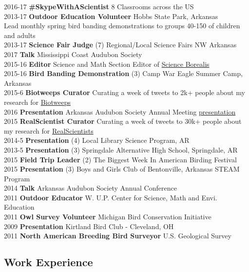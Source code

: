 \documentclass[]{article}
\begin{document}
2016-17 \textbf{\#SkypeWithAScientist} 8 Classrooms across the US\\
2013-17 \textbf{Outdoor Education Volunteer} Hobbs State Park,
Arkansas\\
Lead monthly spring bird banding demonstrations to groups 40-150 of
children and adults\\
2013-17 \textbf{Science Fair Judge} (7) Regional/Local Science Fairs NW
Arkansas\\
2017 \textbf{Talk} Mississippi Coast Audubon Society\\
2015-16 \textbf{Editor} Science and Math Section Editor of
\href{http://scienceborealis.ca/}{Science Borealis}\\
2015-16 \textbf{Bird Banding Demonstration} (3) Camp War Eagle Summer
Camp, Arkansas\\
2015-6 \textbf{Biotweeps Curator} Curating a week of tweets to 2k+
people about my research for
\href{https://biotweep.wordpress.com/about/}{Biotweeps}\\
2016 \textbf{Presentation} Arkansas Audubon Society Annual Meeting
\href{https://dx.doi.org/10.6084/m9.figshare.3206122.v1}{presentation}\\
2015 \textbf{RealScientist Curator} Curating a week of tweets to 30k+
people about my research for
\href{http://realscientists.org/}{RealScientists}\\
2014-5 \textbf{Presentation} (4) Local Library Science Program, AR\\
2013-5 \textbf{Presentation} (3) Springdale Alternative High School,
Springdale, AR\\
2015 \textbf{Field Trip Leader} (2) The Biggest Week In American Birding
Festival\\
2015 \textbf{Presentation} (3) Boys and Girls Club of Bentonville,
Arkansas STEAM Program\\
2014 \textbf{Talk} Arkansas Audubon Society Annual Conference\\
2011 \textbf{Outdoor Educator} W. U.P. Center for Science, Math and
Envi. Education\\
2011 \textbf{Owl Survey Volunteer} Michigan Bird Conservation
Initiative\\
2009 \textbf{Presentation} Kirtland Bird Club - Cleveland, OH\\
2011 \textbf{North American Breeding Bird Surveyor} U.S. Geological
Survey

\subsection{Work Experience}\label{work-experience}
\end{document}
